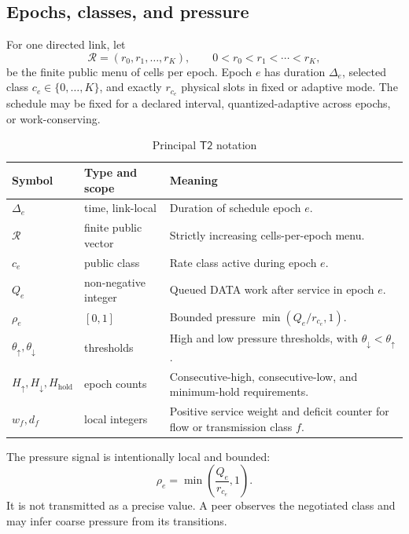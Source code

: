 \documentclass[11pt,oneside]{article}
\newcommand{\Ttwo}{\ensuremath{\mathsf{T2}}}
\begin{document}
\subsection{Epochs, classes, and pressure}

For one directed link, let
\begin{equation}
\mathcal{R}=(r_0,r_1,\ldots,r_K), \qquad 0<r_0<r_1<\cdots<r_K,
\label{eq:ratemenu}
\end{equation}
be the finite public menu of cells per epoch. Epoch $e$ has duration $\Delta_e$, selected class $c_e\in\{0,\ldots,K\}$, and exactly $r_{c_e}$ physical slots in fixed or adaptive mode. The schedule may be fixed for a declared interval, quantized-adaptive across epochs, or work-conserving.

\begin{table}[ht]
\centering
\caption{Principal \Ttwo{} notation}
\label{tab:t2notation}
\begin{tabularx}{\textwidth}{@{}p{}p{}X@{}}
\toprule
Symbol & Type and scope & Meaning \\
\midrule
$\Delta_e$ & time, link-local & Duration of schedule epoch $e$. \\
$\mathcal{R}$ & finite public vector & Strictly increasing cells-per-epoch menu. \\
$c_e$ & public class & Rate class active during epoch $e$. \\
$Q_e$ & non-negative integer & Queued DATA work after service in epoch $e$. \\
$\rho_e$ & $[0,1]$ & Bounded pressure $\min(Q_e/r_{c_e},1)$. \\
$\theta_\uparrow,\theta_\downarrow$ & thresholds & High and low pressure thresholds, with $\theta_\downarrow<\theta_\uparrow$. \\
$H_\uparrow,H_\downarrow,H_{\mathrm{hold}}$ & epoch counts & Consecutive-high, consecutive-low, and minimum-hold requirements. \\
$w_f,d_f$ & local integers & Positive service weight and deficit counter for flow or transmission class $f$. \\
\bottomrule
\end{tabularx}
\end{table}

The pressure signal is intentionally local and bounded:
\begin{equation}
\rho_e=\min\!\left(\frac{Q_e}{r_{c_e}},1\right).
\label{eq:t2pressure}
\end{equation}
It is not transmitted as a precise value. A peer observes the negotiated class and may infer coarse pressure from its transitions.
\end{document}

